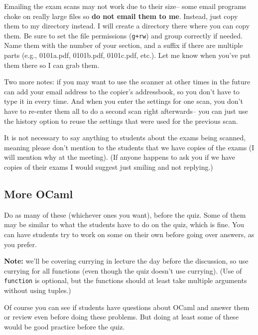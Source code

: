 \documentclass[12pt]{article}
\begin{document}
      Emailing the exam scans may not work due to their size-- some email
    programs choke on really large files so \textbf{do not email them to
    me}.  Instead, just copy them to my directory instead.  I will
    create a directory there where you can copy them.  Be sure to set the
    file permissions (\texttt{g+rw}) and group correctly if needed.  Name
    them with the number of your section, and a suffix if there are
    multiple parts (e.g., 0101a.pdf, 0101b.pdf, 0101c.pdf, etc.).  Let me
    know when you've put them there so I can grab them.

      Two more notes: if you may want to use the scanner at other times in
    the future can add your email address to the copier's addressbook, so
    you don't have to type it in every time.  And when you enter the
    settings for one scan, you don't have to re-enter them all to do a
    second scan right afterwards-- you can just use the history option to
    reuse the settings that were used for the previous scan.

      It is not necessary to say anything to students about the exams being
    scanned, meaning please don't mention to the students that we have
    copies of the exams (I will mention why at the meeting).  (If anyone
    happens to ask you if we have copies of their exams I would suggest
    just smiling and not replying.)

    \subsection{More OCaml}

      Do as many of these (whichever ones you want), before the quiz.  Some
    of them may be similar to what the students have to do on the quiz,
    which is fine.  You can have students try to work on some on their own
    before going over answers, as you prefer.

      \textbf{Note:} we'll be covering currying in lecture the day before the
    discussion, so use currying for all functions (even though the quiz
    doesn't use currying).  (Use of \texttt{function} is optional, but the
    functions should at least take multiple arguments without using tuples.)

      Of course you can see if students have questions about OCaml and answer
    them or review even before doing these problems.  But doing at least
    some of these would be good practice before the quiz.

      \vspace{-2.5mm}
\end{document}
